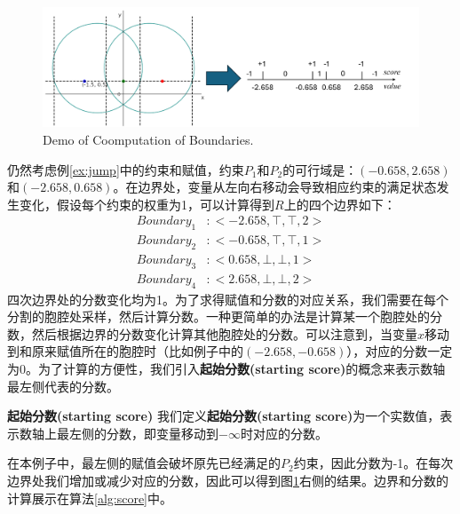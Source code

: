 \begin{example}
\label{ex:jump2}
\begin{figure}[t]
    \centering
    \includegraphics[width=\columnwidth]{Img/boundary.png}
     {Demo of Coomputation of Boundaries.}
\label{fig:boundary}
\end{figure}

仍然考虑例\ref{ex:jump}中的约束和赋值，约束$P_1$和$P_2$的可行域是：$(-0.658, 2.658)$和$(-2.658, 0.658)$。在边界处，变量从左向右移动会导致相应约束的满足状态发生变化，假设每个约束的权重为1，可以计算得到$R$上的四个边界如下：
\begin{align}
Boundary_1 &: <-2.658, \top, \top, 2> \nonumber \\
Boundary_2 &: <-0.658, \top, \top, 1> \nonumber \\
Boundary_3 &: <0.658, \bot, \bot, 1> \nonumber \\
Boundary_4 &: <2.658, \bot, \bot, 2> \nonumber
\end{align}
四次边界处的分数变化均为1。为了求得赋值和分数的对应关系，我们需要在每个分割的胞腔处采样，然后计算分数。一种更简单的办法是计算某一个胞腔处的分数，然后根据边界的分数变化计算其他胞腔处的分数。可以注意到，当变量$x$移动到和原来赋值所在的胞腔时（比如例子中的$(-2.658, -0.658)$），对应的分数一定为0。为了计算的方便性，我们引入\textbf{起始分数(starting score)}的概念来表示数轴最左侧代表的分数。

\begin{definition}{\textbf{起始分数(starting score)}}
我们定义\textbf{起始分数(starting score)}为一个实数值，表示数轴上最左侧的分数，即变量移动到$-\infty$时对应的分数。
\end{definition}
在本例子中，最左侧的赋值会破坏原先已经满足的$P_2$约束，因此分数为-1。在每次边界处我们增加或减少对应的分数，因此可以得到图\ref{fig:boundary}右侧的结果。边界和分数的计算展示在算法\ref{alg:score}中。
\end{example}

